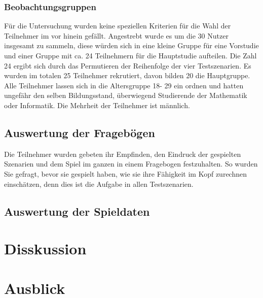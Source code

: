 \subsection{Beobachtungsgruppen}
Für die Untersuchung wurden keine speziellen Kriterien für die Wahl der Teilnehmer im vor hinein gefällt. Angestrebt wurde es um die 30 Nutzer insgesamt zu sammeln, diese würden sich in eine kleine Gruppe für eine Vorstudie und einer Gruppe mit ca. 24 Teilnehmern für die Hauptstudie aufteilen. Die Zahl 24 ergibt sich durch das Permutieren der Reihenfolge der vier Testszenarien. Es wurden im totalen 25 Teilnehmer rekrutiert, davon bilden 20 die Hauptgruppe. Alle Teilnehmer lassen sich in die Altersgruppe 18- 29 ein ordnen und hatten ungefähr den selben Bildungsstand, überwiegend Studierende der Mathematik oder Informatik. Die Mehrheit der Teilnehmer ist männlich.

\section{Auswertung der Fragebögen}
Die Teilnehmer wurden gebeten ihr Empfinden, den Eindruck der gespielten Szenarien und dem Spiel im ganzen in einem Fragebogen festzuhalten. So wurden Sie gefragt, bevor sie gespielt haben, wie sie ihre Fähigkeit im Kopf zurechnen einschätzen, denn dies ist die Aufgabe in allen Testszenarien. 
\newline
\section{Auswertung der Spieldaten}

\chapter{Disskussion}
\chapter{Ausblick}
%

\listoffigures


